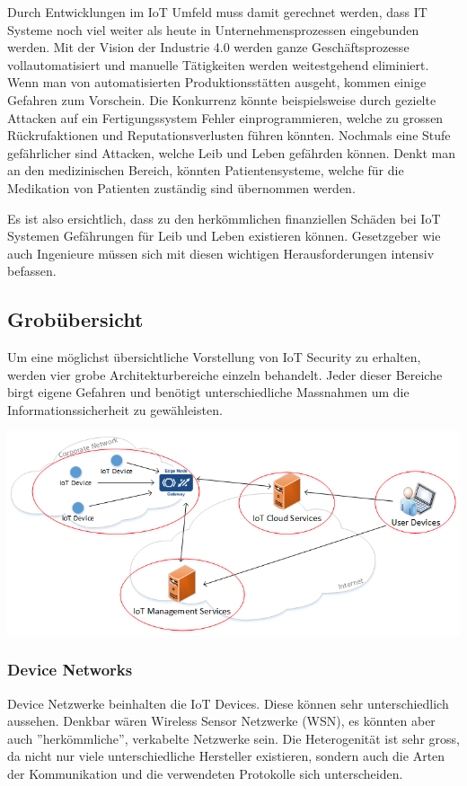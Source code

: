 Durch Entwicklungen im IoT Umfeld muss damit gerechnet werden, dass IT Systeme noch viel weiter als heute in Unternehmensprozessen eingebunden werden. Mit der Vision der Industrie 4.0 werden ganze Geschäftsprozesse vollautomatisiert und manuelle Tätigkeiten werden weitestgehend eliminiert. Wenn man von automatisierten Produktionsstätten ausgeht, kommen einige Gefahren zum Vorschein. Die Konkurrenz könnte beispielsweise durch gezielte Attacken auf ein Fertigungssystem Fehler einprogrammieren, welche zu grossen Rückrufaktionen und Reputationsverlusten führen könnten. Nochmals eine Stufe gefährlicher sind Attacken, welche Leib und Leben gefährden können. Denkt man an den medizinischen Bereich, könnten Patientensysteme, welche für die Medikation von Patienten zuständig sind übernommen werden.

Es ist also ersichtlich, dass zu den herkömmlichen finanziellen Schäden bei IoT Systemen Gefährungen für Leib und Leben existieren können. Gesetzgeber wie auch Ingenieure müssen sich mit diesen wichtigen Herausforderungen intensiv befassen.

\subsection{Grobübersicht}  
Um eine möglichst übersichtliche Vorstellung von IoT Security zu erhalten, werden vier grobe Architekturbereiche einzeln behandelt. Jeder dieser Bereiche birgt eigene Gefahren und benötigt unterschiedliche Massnahmen um die Informationssicherheit zu gewähleisten.

\includegraphics[scale=0.8]{../02_Analyse/images/security_overview.png}

\subsubsection{Device Networks}
Device Netzwerke beinhalten die IoT Devices. Diese können sehr unterschiedlich aussehen. Denkbar wären Wireless Sensor Netzwerke (WSN), es könnten aber auch ''herkömmliche'', verkabelte Netzwerke sein. Die Heterogenität ist sehr gross, da nicht nur viele unterschiedliche Hersteller existieren, sondern auch die Arten der Kommunikation und die verwendeten Protokolle sich unterscheiden. 

